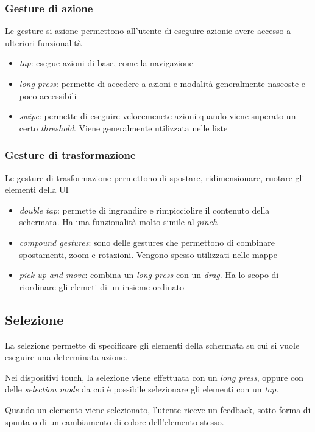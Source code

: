 \documentclass[12pt, a4paper]{report}
\begin{document}
			\subsubsection{Gesture di azione}
			Le gesture si azione permettono all'utente di eseguire azionie avere accesso a ulteriori funzionalità
			\begin{itemize}
				\item \textit{tap}: esegue azioni di base, come la navigazione 
				\item \textit{long press}: permette di accedere a azioni e modalità generalmente nascoste e poco accessibili
				\item \textit{swipe}: permette di eseguire velocemenete azioni quando viene superato un certo \textit{threshold}. Viene generalmente utilizzata nelle liste
			\end{itemize}
			
			\subsubsection{Gesture di trasformazione}
			Le gesture di trasformazione permettono di spostare, ridimensionare, ruotare gli elementi della UI
			\begin{itemize}
				\item \textit{double tap}: permette di ingrandire e rimpicciolire il contenuto della schermata. Ha una funzionalità molto simile al \textit{pinch}
				\item \textit{compound gestures}: sono delle gestures che permettono di combinare spostamenti, zoom e rotazioni. Vengono spesso utilizzati nelle mappe
				\item \textit{pick up and move}: combina un \textit{long press} con un \textit{drag}. Ha lo scopo di riordinare gli elemeti di un insieme ordinato
			\end{itemize}

		\subsection{Selezione}
		La selezione permette di specificare gli elementi della schermata su cui si vuole eseguire una determinata azione.

		Nei dispositivi touch, la selezione viene effettuata con un \textit{long press}, oppure con delle \textit{selection mode} da cui è possibile selezionare gli elementi con un \textit{tap}.
		
		Quando un elemento viene selezionato, l'utente riceve un feedback, sotto forma di spunta o di un cambiamento di colore dell'elemento stesso.
		
\end{document}

